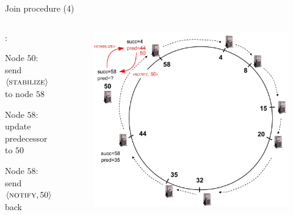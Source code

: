 \begin{frame}{Join procedure (4)}

\begin{columns}
\begin{column}{0.4\textwidth}
:
\BI
\item Node $50$: send $\langle \textsc{stabilize} \rangle$ to node $58$ 
\item Node $58$: update predecessor to $50$  
\item Node $58$: send $\langle \textsc{notify}, 50 \rangle$ back
\EI

\end{column}
\begin{column}{0.6\textwidth}
\begin{figure}
\includegraphics[width=1.0\textwidth]{chord-example5}
\end{figure}
\end{column}
\end{columns}

\end{frame}

